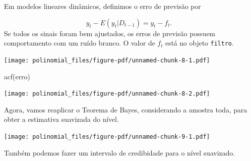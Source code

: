\documentclass[
  letterpaper,
  DIV=11,
  numbers=noendperiod]{scrreprt}
\newenvironment{Shaded}{\begin{snugshade}}{\end{snugshade}}
\newcommand{\AttributeTok}[1]{\textcolor[rgb]{0.40,0.45,0.13}{#1}}
\newcommand{\DecValTok}[1]{\textcolor[rgb]{0.68,0.00,0.00}{#1}}
\newcommand{\FunctionTok}[1]{\textcolor[rgb]{0.28,0.35,0.67}{#1}}
\newcommand{\NormalTok}[1]{\textcolor[rgb]{0.00,0.23,0.31}{#1}}
\newcommand{\OtherTok}[1]{\textcolor[rgb]{0.00,0.23,0.31}{#1}}
\newcommand{\SpecialCharTok}[1]{\textcolor[rgb]{0.37,0.37,0.37}{#1}}
\newcommand{\StringTok}[1]{\textcolor[rgb]{0.13,0.47,0.30}{#1}}
\begin{document}
Em modelos lineares dinâmicos, definimos o erro de previsão por

\[y_t-E(y_t|D_{t-1})=y_t-f_t.\] Se todos os sinais foram bem ajustados,
os erros de previsão possuem comportamento com um ruído branco. O valor
de \(f_t\) está no objeto \texttt{filtro}.

\begin{Shaded}
\end{Shaded}

\texttt{[image: polinomial\_files/figure-pdf/unnamed-chunk-8-1.pdf]}

\begin{Shaded}
\begin{Highlighting}[]
\FunctionTok{acf}\NormalTok{(erro)}
\end{Highlighting}
\end{Shaded}

\texttt{[image: polinomial\_files/figure-pdf/unnamed-chunk-8-2.pdf]}

Agora, vamos reaplicar o Teorema de Bayes, considerando a amostra toda,
para obter a estimativa suavizada do nível.

\begin{Shaded}
\end{Shaded}

\texttt{[image: polinomial\_files/figure-pdf/unnamed-chunk-9-1.pdf]}

Também podemos fazer um intervalo de credibidade para o nível suavizado.
\end{document}
